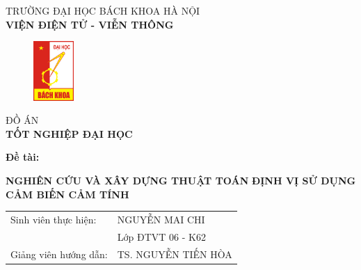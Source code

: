 \documentclass{article} %
\begin{document}
\begin{titlepage}
\begin{center}
\vspace{-0.5cm}\fontsize{13pt}{0pt}\selectfont TRƯỜNG ĐẠI HỌC BÁCH KHOA HÀ NỘI \\
\textbf{\fontsize{16pt}{0pt}\selectfont VIỆN ĐIỆN TỬ - VIỄN THÔNG}
\vspace{0.5cm}
\begin{figure}[H]
	\centering
	\includegraphics[height=2.26cm,width=1.53cm]{Images/logoBk.png}
\end{figure}
\vspace{1.5cm}
{\fontsize{24pt}{0pt}\selectfont ĐỒ ÁN}\\
\vspace{12pt}
\textbf{\fontsize{32pt}{0pt}\selectfont TỐT NGHIỆP ĐẠI HỌC}
\end{center}
\vspace{0.8cm}
\hspace{6pt}\textbf{\fontsize{14pt}{0pt}\selectfont Đề tài:}\\
\vspace{-20pt}
\begin{center}
    \textbf{\fontsize{20pt}{0pt}\selectfont NGHIÊN CỨU VÀ XÂY DỰNG THUẬT TOÁN}
    \textbf{\fontsize{20pt}{0pt}\selectfont ĐỊNH VỊ SỬ DỤNG CẢM BIẾN CẢM TÍNH}
    
\vspace{1.5cm}
\begin{tabular}{ l l }
\fontsize{14pt}{0pt}\selectfont Sinh viên thực hiện: & \fontsize{14pt}{0pt}\selectfont \vspace{6pt} NGUYỄN MAI CHI  \\ 
  & \fontsize{14pt}{0pt}\selectfont \vspace{6pt}Lớp ĐTVT 06 - K62 \\   
\fontsize{14pt}{0pt}\selectfont Giảng viên hướng dẫn: & \fontsize{14pt}{0pt}\selectfont TS. NGUYỄN TIẾN HÒA
\end{tabular}


\end{center}
\end{titlepage}
\end{document}
